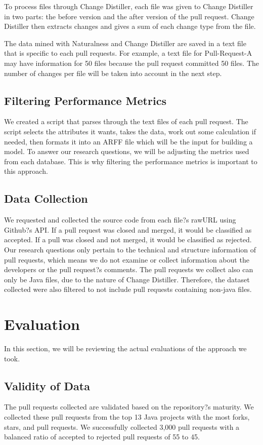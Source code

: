 \documentclass[10pt, conference]{IEEEtran}
\begin{document}
To process files through Change Distiller, each file was given to Change Distiller in two parts: the before version and the after version of the pull request. Change Distiller then extracts changes and gives a sum of each change type from the file. 

The data mined with Naturalness and Change Distiller are saved in a text file that is specific to each pull requests. For example, a text file for Pull-Request-A may have information for 50 files because the pull request committed 50 files. The number of changes per file will be taken into account in the next step.

\subsection{Filtering Performance Metrics}
We created a script that parses through the text files of each pull request. The script selects the attributes it wants, takes the data, work out some calculation if needed, then formats it into an ARFF file which will be the input for building a model. To answer our research questions, we will be adjusting the metrics used from each database. This is why filtering the performance metrics is important to this approach.

\subsection{Data Collection}
We requested and collected the source code from each file?s rawURL using Github?s API. If a pull request was closed and merged, it would be classified as accepted. If a pull was closed and not merged, it would be classified as rejected. Our research questions only pertain to the technical and structure information of pull requests, which means we do not examine or collect information about the developers or the pull request?s comments. The pull requests we collect also can only be Java files, due to the nature of Change Distiller. Therefore, the dataset collected were also filtered to not include pull requests containing non-java files.

\section{Evaluation}
In this section, we will be reviewing the actual evaluations of the approach we took.

\subsection{Validity of Data}
The pull requests collected are validated based on the repository?s maturity. We collected these pull requests from the top 13 Java projects with the most forks, stars, and pull requests. We successfully collected 3,000 pull requests with a balanced ratio of accepted to rejected pull requests of 55 to 45.
\end{document}
